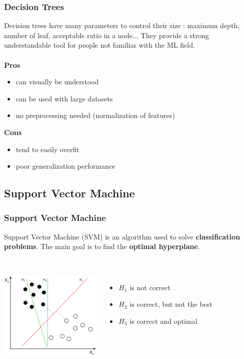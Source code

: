 \documentclass{beamer}
\begin{document}
\begin{frame}
  \frametitle{Decision Trees}
  Decision trees have many parameters to control their size : maximum depth,
  number of leaf, acceptable ratio in a node... They provide a strong
  understandable tool for people not familiar with the ML field.
  \\~\\
  \textbf{Pros}
  \begin{itemize}
    \item can visually be understood
    \item can be used with large datasets
    \item no preprocessing needed (normalization of features)
  \end{itemize}

  \textbf{Cons}
  \begin{itemize}
    \item tend to easily overfit
    \item poor generalization performance
  \end{itemize}
\end{frame}

\subsection{Support Vector Machine}
\begin{frame}
  \frametitle{Support Vector Machine}
  Support Vector Machine (SVM) is an algorithm used to solve
  \textbf{classification problems}. The main goal is to find the \textbf{optimal
  hyperplane}.\\~\\

  \begin{columns}
      \centering
      \includegraphics[height=4.2cm]{img/svm_goal.png}

      \begin{itemize}
        \item ${H_1}$ is not correct
        \item ${H_2}$ is correct, but not the best
        \item ${H_3}$ is correct and optimal
      \end{itemize}
    \end{columns}
\end{frame}
\end{document}
